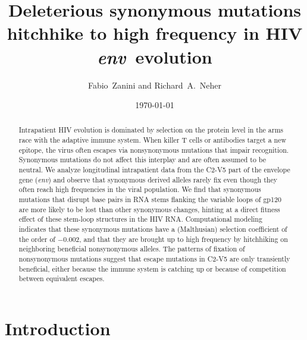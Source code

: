 \documentclass[rmp, twocolumn]{revtex4}
\newcommand{\env}{\textit{env}}
\newcommand{\shankaregion}{C2-V5}
\newcommand{\Author}{Fabio~Zanini and Richard~A.~Neher}
\newcommand{\Title}{Deleterious synonymous mutations hitchhike to high frequency in HIV \env~evolution}
\begin{document}
\title{\Title}
\author{\Author}
\date{\today}

\begin{abstract}
\noindent

Intrapatient HIV evolution is dominated by selection on the protein level in the
arms race with the adaptive immune system. When killer T cells or antibodies
target a new epitope, the virus often escapes via nonsynonymous mutations that
impair recognition. Synonymous mutations do not affect this interplay and are
often assumed to be neutral.
We analyze longitudinal intrapatient data from the \shankaregion{} part of the
envelope gene (\env{}) and observe that synonymous derived alleles rarely
fix even though they often reach high frequencies in the viral population.
We find that synonymous mutations that disrupt base pairs in RNA stems flanking
the variable loops of gp120 are more likely to be lost than other synonymous
changes, hinting at a direct fitness effect of these stem-loop structures in the
HIV RNA.
Computational modeling indicates that these synonymous mutations have a
(Malthusian) selection coefficient of the order of $-0.002$, and that they are
brought up to high frequency by hitchhiking on neighboring beneficial
nonsynonymous alleles. The patterns of fixation of nonsynonymous mutations
suggest that escape mutations in \shankaregion{} are only transiently
beneficial, either because the immune system is catching up or because of
competition between equivalent escapes.

\end{abstract}
\maketitle
\section{Introduction}
\end{document}
